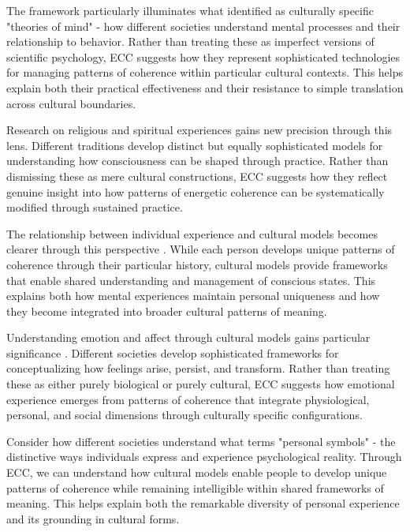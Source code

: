 The framework particularly illuminates what \cite{levy1973tahitians} identified as culturally specific "theories of mind" - how different societies understand mental processes and their relationship to behavior. Rather than treating these as imperfect versions of scientific psychology, ECC suggests how they represent sophisticated technologies for managing patterns of coherence within particular cultural contexts. This helps explain both their practical effectiveness and their resistance to simple translation across cultural boundaries.

Research on religious and spiritual experiences \cite{luhrmann2012when} gains new precision through this lens. Different traditions develop distinct but equally sophisticated models for understanding how consciousness can be shaped through practice. Rather than dismissing these as mere cultural constructions, ECC suggests how they reflect genuine insight into how patterns of energetic coherence can be systematically modified through sustained practice.

The relationship between individual experience and cultural models becomes clearer through this perspective \cite{white1994ethnopsychology}. While each person develops unique patterns of coherence through their particular history, cultural models provide frameworks that enable shared understanding and management of conscious states. This explains both how mental experiences maintain personal uniqueness and how they become integrated into broader cultural patterns of meaning.

Understanding emotion and affect through cultural models gains particular significance \cite{wikan1990managing}. Different societies develop sophisticated frameworks for conceptualizing how feelings arise, persist, and transform. Rather than treating these as either purely biological or purely cultural, ECC suggests how emotional experience emerges from patterns of coherence that integrate physiological, personal, and social dimensions through culturally specific configurations.

Consider how different societies understand what \cite{obeyesekere1981medusa} terms "personal symbols" - the distinctive ways individuals express and experience psychological reality. Through ECC, we can understand how cultural models enable people to develop unique patterns of coherence while remaining intelligible within shared frameworks of meaning. This helps explain both the remarkable diversity of personal experience and its grounding in cultural forms.

